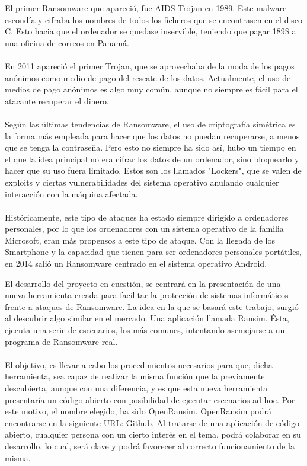 \documentclass[a4paper,12pt]{article}
\begin{document}
El primer Ransomware que apareció, fue AIDS Trojan en 1989. Este malware escondía y cifraba los nombres de todos los ficheros que se encontrasen en el disco C. Esto hacia que el ordenador se quedase inservible, teniendo que pagar 189\$ a una oficina de correos en Panamá.\\\\
En 2011 apareció el primer Trojan, que se aprovechaba de la moda de los pagos anónimos como medio de pago del rescate de los datos. Actualmente, el uso de medios de pago anónimos es algo muy común, aunque no siempre es fácil para el atacante recuperar el dinero.\\\\
Según las últimas tendencias de Ransomware, el uso de criptografía simétrica es la forma más empleada para hacer que los datos no puedan recuperarse, a menos que se tenga la contraseña. Pero esto no siempre ha sido así, hubo un tiempo en el que la idea principal no era cifrar los datos de un ordenador, sino bloquearlo y hacer que su uso fuera limitado. Estos son los llamados "Lockers", que se valen de exploits y ciertas vulnerabilidades del sistema operativo anulando cualquier interacción con la máquina afectada.\\\\
Históricamente, este tipo de ataques ha estado siempre dirigido a ordenadores personales, por lo que los ordenadores con un sistema operativo de la familia Microsoft, eran más propensos a este tipo de ataque. Con la llegada de los Smartphone y la capacidad que tienen para ser ordenadores personales portátiles, en 2014 salió un Ransomware centrado en el sistema operativo Android. 

El desarrollo del proyecto en cuestión, se centrará en la presentación de una nueva herramienta creada para facilitar la protección de sistemas informáticos frente a ataques de Ransomware. La idea en la que se basará este trabajo, surgió al descubrir algo similar en el mercado. Una aplicación llamada Ransim. Ésta, ejecuta una serie de escenarios, los más comunes, intentando asemejarse a un programa de Ransomware real.\\\\
El objetivo, es llevar a cabo los procedimientos necesarios para que, dicha herramienta, sea capaz de realizar la misma función que la previamente descubierta, aunque con una diferencia, y es que esta nueva herramienta presentaría un código abierto con posibilidad de ejecutar escenarios ad hoc. Por este motivo, el nombre elegido, ha sido OpenRansim. OpenRansim podrá encontrarse en la siguiente URL: \href{https://github.com/iserranos/OpenRansim}{Github}. 
Al tratarse de una aplicación de código abierto, cualquier persona con un cierto interés en el tema, podrá colaborar en su desarrollo, lo cual, será clave y podrá favorecer al correcto funcionamiento de la misma.
 
\end{document}
